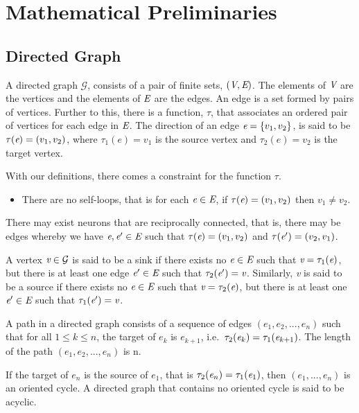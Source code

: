 \section{Mathematical Preliminaries}
\subsection{Directed Graph}
A directed graph $\mathcal{G}$, consists of a pair of finite sets, $(\emph{V},\emph{E})$. The elements of $\emph{V}$ are the vertices and the elements of $\emph{E}$ are the edges. An edge is a set formed by pairs of vertices. Further to this, there is a function, $\tau$, that associates an ordered pair of vertices for each edge in $\emph{E}$. The direction of an edge $\emph{e} = \{v_1, v_2\}$, is said to be $\tau(\emph{e}) = (v_1, v_2)$, where $\tau_{1}(e) = v_1$ is the source vertex and $\tau_{2}(e) = v_2$ is the target vertex. 

With our definitions, there comes a constraint for the function $\tau$. 
\begin{itemize}
\item There are no self-loops, that is for each $\emph{e} \in \emph{E}$, if $\tau(\emph{e}) = (v_1, v_2)$ then $v_1 \neq v_2$.
\end{itemize}

There may exist neurons that are reciprocally connected, that is, there may be edges whereby we have $\emph{e}, \emph{e}^\prime \in \emph{E}$ such that $\tau(\emph{e})=(v_1,v_2)$ and $\tau(\emph{e}^\prime) = (v_2,v_1)$.

A vertex $\emph{v} \in \mathcal{G}$ is said to be a sink if there exists no $\emph{e} \in \emph{E}$ such that $\emph{v}=\tau_1(\emph{e})$, but there is at least one edge $\emph{e}^\prime \in \emph{E}$ such that $\tau_2(\emph{e}^\prime) = \emph{v}$. Similarly, \emph{v} is said to be a source if there exists no $\emph{e} \in \emph{E}$ such that $\emph{v} = \tau_2(\emph{e})$, but there is at least one $\emph{e}^\prime \in \emph{E}$ such that $\tau_1(\emph{e}^\prime) = \emph{v}$. 

A path in a directed graph consists of a sequence of edges $(e_1, e_2, ..., e_n)$ such that for all $1 \leq k \leq n$, the target of $e_k$ is $e_{k+1}$, i.e.~$\tau_2(\emph{e}_k) = \tau_1(\emph{e}_{k+1})$. The length of the path $(e_1, e_2, ..., e_n)$ is n. 

If the target of $e_n$ is the source of $e_1$, that is $\tau_2(\emph{e}_n) = \tau_1(\emph{e}_1)$, then $(e_1, ..., e_n)$ is an oriented cycle. A directed graph that contains no oriented cycle is said to be acyclic.

